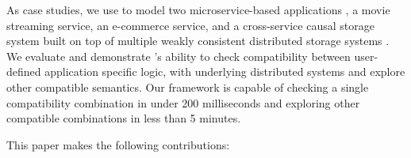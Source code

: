 
As case studies, we use \sysname{} to model two microservice-based
applications \cite{gan2019an}, a movie streaming service, an e-commerce
service, and a cross-service causal storage system built on top of
multiple weakly consistent distributed storage systems \cite{boltoncc}.
We evaluate and demonstrate \sysname{}'s ability to check compatibility
between user-defined application specific logic, with underlying
distributed systems and explore other compatible semantics.
Our framework is capable of checking a single compatibility combination in under 200 milliseconds and exploring
other compatible combinations in less than 5 minutes.


This paper makes the following contributions:

